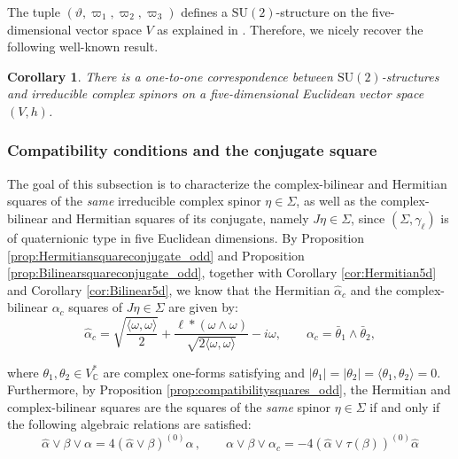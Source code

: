 \documentclass[10pt,a4paper,twoside,reqno]{amsart}
\theoremstyle{plain}
\newtheorem{cor}[thm]{Corollary}
\theoremstyle{definition}
\theoremstyle{remark}
\def\C{\mathbb{C}}
\def\SU{\mathrm{SU}}
\newcommand{\abs}[1]{\left\lvert#1\right\rvert}
\newcommand{\escal}[1]{\langle#1\rangle}
\begin{document}
\noindent
The tuple $(\vartheta,\varpi_1,\varpi_2,\varpi_3)$ defines a $\SU(2)$-structure on the five-dimensional vector space $V$ as explained in \cite[Proposition 1.1]{CS07}. Therefore, we nicely recover the following well-known result. 

\begin{cor}
There is a one-to-one correspondence between $\SU(2)$-structures and irreducible complex spinors on a five-dimensional Euclidean vector space $(V,h)$.
\end{cor}


\subsubsection{Compatibility conditions and the conjugate square}


The goal of this subsection is to characterize the complex-bilinear and Hermitian squares of the \emph{same} irreducible complex spinor $\eta\in\Sigma$, as well as the complex-bilinear and Hermitian squares of its conjugate, namely $J\eta\in\Sigma$, since $(\Sigma,\gamma_\ell)$ is of quaternionic type in five Euclidean dimensions. By Proposition \ref{prop:Hermitiansquareconjugate_odd} and Proposition \ref{prop:Bilinearsquareconjugate_odd}, together with Corollary \ref{cor:Hermitian5d} and Corollary \ref{cor:Bilinear5d}, we know that the Hermitian $\widehat{\alpha}_c$ and the complex-bilinear $\alpha_c$ squares of $J\eta\in\Sigma$ are given by:
\begin{equation*}
\widehat{\alpha}_c=\sqrt{\frac{\escal{\omega,\omega}}{2}} + \frac{\ell *(\omega\wedge\omega)}{\sqrt{2\escal{\omega,\omega}}}-i\omega,\qquad \alpha_c=\bar\theta_1\wedge\bar\theta_2,
\end{equation*}

\noindent
where $\theta_1,\theta_2\in V^{\ast}_{\C}$ are complex one-forms satisfying and $\abs{\theta_1}=\abs{\theta_2}=\escal{\theta_1,\theta_2}=0$. Furthermore, by Proposition \ref{prop:compatibilitysquares_odd}, the Hermitian and complex-bilinear squares are the squares of the \emph{same} spinor $\eta\in\Sigma$ if and only if the following algebraic relations are satisfied:
\begin{equation*}
\widehat{\alpha} \vee \beta \vee \alpha   = 4 (\widehat{\alpha} \vee \beta)^{(0)} \alpha \, , \qquad   \alpha \vee \beta \vee \alpha_c = -  4    (\widehat{\alpha} \vee   \tau(\beta))^{(0)} \widehat{\alpha}
\end{equation*}
\end{document}
